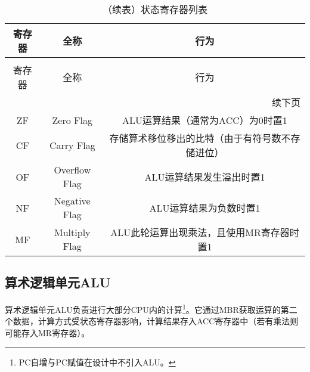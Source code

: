 \documentclass[lang=cn,a4paper,newtx]{elegantpaper}
\begin{document}
\begin{longtable}{c c c}
  \caption{状态寄存器列表} \label{tab:CPU:status} \\
  \toprule
  寄存器 & 全称 & 行为 \\ 
  \midrule
  \endfirsthead

  \caption[]{（续表）状态寄存器列表} \\
  \toprule
  寄存器 & 全称 & 行为\\
  \midrule
  \endhead

  \midrule
  \multicolumn{3}{r}{续下页} \\
  \midrule
  \endfoot

  \bottomrule
  \endlastfoot

  ZF   & Zero Flag             & ALU运算结果（通常为ACC）为0时置1\\
  CF  & Carry Flag     & 存储算术移位移出的比特（由于有符号数不存储进位）\\
  OF  & Overflow Flag &  ALU运算结果发生溢出时置1\\
  NF  & Negative Flag &  ALU运算结果为负数时置1\\
  MF & Multiply Flag & ALU此轮运算出现乘法，且使用MR寄存器时置1\\
\end{longtable}
\subsection{算术逻辑单元ALU}
算术逻辑单元ALU负责进行大部分CPU内的计算\footnote{PC自增与PC赋值在设计中不引入ALU。}。它通过MBR获取运算的第二个数据，计算方式受状态寄存器影响，计算结果存入ACC寄存器中（若有乘法则可能存入MR寄存器）。
\end{document}
